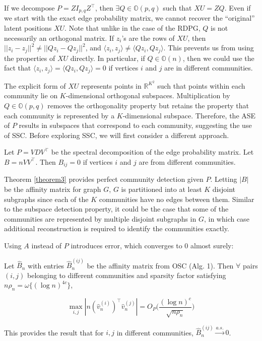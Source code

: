 \documentclass[12pt]{article}
\begin{document}
If we decompose \(P = Z I_{p, q} Z^\top\), then
\(\exists Q \in \mathbb{O}(p, q)\) such that \(XU = Z Q\). Even if we
start with the exact edge probability matrix, we cannot recover the
``original'' latent positions \(XU\). Note that unlike in the case of
the RDPG, \(Q\) is not necessarily an orthogonal matrix. If \(z_i\)'s
are the rows of \(XU\), then
\(||z_i - z_j||^2 \neq ||Q z_i - Q z_j||^2\), and
\(\langle z_i, z_j \rangle \neq \langle Q z_i, Q z_j \rangle\). This
prevents us from using the properties of \(XU\) directly. In particular,
if \(Q \in \mathbb{O}(n)\), then we could use the fact that
\(\langle z_i, z_j \rangle = \langle Q z_i, Q z_j \rangle = 0\) if
vertices \(i\) and \(j\) are in different communities.

The explicit form of \(XU\) represents points in \(\mathbb{R}^{K^2}\)
such that points within each community lie on \(K\)-dimensional
orthogonal subspaces. Multiplication by \(Q \in \mathbb{O}(p, q)\)
removes the orthogonality property but retains the property that each
community is represented by a \(K\)-dimensional subspace. Therefore, the
ASE of \(P\) results in subspaces that correspond to each community,
suggesting the use of SSC. Before exploring SSC, we will first consider
a different approach.

\begin{theorem}
\label{theorem3}
Let $P = V D V^\top$ be the spectral decomposition of the edge probability
matrix. Let $B = n V V^\top$. Then $B_{ij} = 0$ if vertices $i$ and $j$ are
from different communities.
\end{theorem}

Theorem \ref{theorem3} provides perfect community detection given \(P\).
Letting \(|B|\) be the affinity matrix for graph \(G\), \(G\) is
partitioned into at least \(K\) disjoint subgraphs since each of the
\(K\) communities have no edges between them. Similar to the subspace
detection property, it could be the case that some of the communities
are represented by multiple disjoint subgraphs in \(G\), in which case
additional reconstruction is required to identify the communities
exactly.

Using \(A\) instead of \(P\) introduces error, which converges to \(0\)
almost surely:

\begin{theorem}
\label{theorem4}
Let $\hat{B}_n$ with entries $\hat{B}_n^{(ij)}$ be the affinity matrix from OSC
(Alg. 1). Then $\forall$ pairs $(i, j)$ belonging to different communities
and sparsity factor satisfying $n \rho_n = \omega\{(\log n)^{4c}\}$,

\begin{equation} \label{eq:thm4}
\max_{i, j} |n (\hat{v}_n^{(i)})^\top \hat{v}_n^{(j)}| =
O_P \Big( \frac{(\log n)^c}{\sqrt{n \rho_n}} \Big)
\end{equation}

This provides the result that for $i, j$ in different communities,
$\hat{B}_n^{(ij)} \stackrel{a.s.}{\to} 0$.
\end{theorem}
\end{document}

